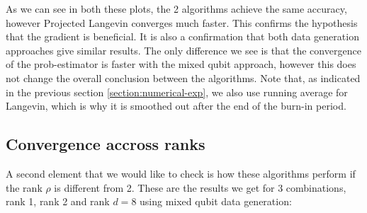 \documentclass[12pt]{memoir}
\begin{document}
As we can see in both these plots, the 2 algorithms achieve the same accuracy, however Projected Langevin converges much faster. This confirms the hypothesis that the gradient is beneficial. It is also a confirmation that both data generation approaches give similar results. The only difference we see is that the convergence of the prob-estimator is faster with the mixed qubit approach, however this does not change the overall conclusion between the algorithms. Note that, as indicated in the previous section \ref{section:numerical-exp}, we also use running average for Langevin, which is why it is smoothed out after the end of the burn-in period.

\subsection*{Convergence accross ranks}
A second element that we would like to check is how these algorithms perform if the rank $\rho$ is different from 2. These are the results we get for 3 combinations, rank 1, rank 2 and rank $d=8$ using mixed qubit data generation:
\end{document}
